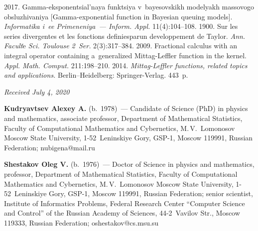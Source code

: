 \begin{multicols}{2}
{{\begin{thebibliography}{99}
2017. Gamma-eksponentsial'naya funktsiya v~bayesovskikh modelyakh massovogo 
obsluzhivaniya [Gamma-exponential function in Bayesian queuing models]. 
\textit{Informatika i~ee Primeneniya~--- Inform. Appl.} 11(4):104--108.
 1900. Sur les series divergentes 
et les fonctions definiesparun developpement de Taylor. 
\textit{Ann. Facult$\acute{\mbox{e}}$ Sci. 
Toulouse 2~Ser.} 2(3):317--384.
 2009. Fractional calculus with an integral operator containing 
 a~generalized Mittag-Leffler function in the kernel. 
 \textit{Appl. Math. Comput.} 211:198--210.
 2014. \textit{Mittag-Leffler functions, related topics and applications.}
  Berlin--Heidelberg: Springer-Verlag. 443~p.
\end{thebibliography}

 }
 }

\end{multicols}

\vspace*{-12pt}

\hfill{\small\textit{Received July 4, 2020}}

\pagebreak


 

\Contr


\noindent
\textbf{Kudryavtsev Alexey A.} (b.\ 1978)~--- 
Candidate of Science (PhD) in physics and mathematics, associate professor, 
Department of Mathematical Statistics, Faculty of Computational Mathematics 
and Cybernetics, M.\,V.~Lomonosov Moscow State University, 
1-52~Leninskiye Gory, GSP-1, Moscow 119991, Russian Federation; 
\mbox{nubigena@mail.ru}

\vspace*{6pt}

\noindent
\textbf{Shestakov Oleg V.} (b.\ 1976)~--- 
Doctor of Science in physics and mathematics, professor, 
Department of Mathematical Statistics, Faculty of Computational Mathematics 
and Cybernetics, M.\,V.~Lomonosov Moscow State University, 1-52~Leninskiye 
Gory, GSP-1, Moscow 119991, Russian Federation; senior scientist, 
Institute of Informatics Problems, Federal Research Center 
``Computer Science and Control'' of the Russian Academy of Sciences, 
44-2~Vavilov Str., Moscow 119333, Russian Federation; \mbox{oshestakov@cs.msu.su}
\label{end\stat}

\renewcommand{\bibname}{\protect\rm Литература} 

\renewcommand{\figurename}{\protect\bf Рис.}